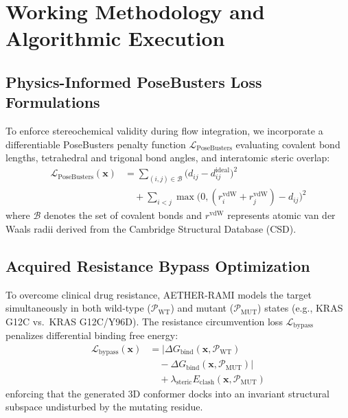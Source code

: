 \section{Working Methodology and Algorithmic Execution}
\label{sec:method}

\subsection{Physics-Informed PoseBusters Loss Formulations}
To enforce stereochemical validity during flow integration, we incorporate a differentiable PoseBusters penalty function $\mathcal{L}_{\text{PoseBusters}}$ evaluating covalent bond lengths, tetrahedral and trigonal bond angles, and interatomic steric overlap:
\begin{equation}
\begin{split}
\mathcal{L}_{\text{PoseBusters}}(\mathbf{x}) &= \sum_{(i,j) \in \mathcal{B}} \big( d_{ij} - d_{ij}^{\text{ideal}} \big)^2 \\
&\quad + \sum_{i < j} \max\big(0, (r_i^{\text{vdW}} + r_j^{\text{vdW}}) - d_{ij}\big)^2
\end{split}
\label{eq:posebusters_loss}
\end{equation}
where $\mathcal{B}$ denotes the set of covalent bonds and $r^{\text{vdW}}$ represents atomic van der Waals radii derived from the Cambridge Structural Database (CSD).

\subsection{Acquired Resistance Bypass Optimization}
To overcome clinical drug resistance, AETHER-RAMI models the target simultaneously in both wild-type ($\mathcal{P}_{\text{WT}}$) and mutant ($\mathcal{P}_{\text{MUT}}$) states (e.g., KRAS G12C vs.\ KRAS G12C/Y96D). The resistance circumvention loss $\mathcal{L}_{\text{bypass}}$ penalizes differential binding free energy:
\begin{equation}
\begin{split}
\mathcal{L}_{\text{bypass}}(\mathbf{x}) &= \big| \Delta G_{\text{bind}}(\mathbf{x}, \mathcal{P}_{\text{WT}}) \\
&\quad - \Delta G_{\text{bind}}(\mathbf{x}, \mathcal{P}_{\text{MUT}}) \big| \\
&\quad + \lambda_{\text{steric}} E_{\text{clash}}(\mathbf{x}, \mathcal{P}_{\text{MUT}})
\end{split}
\label{eq:bypass_loss}
\end{equation}
enforcing that the generated 3D conformer docks into an invariant structural subspace undisturbed by the mutating residue.

